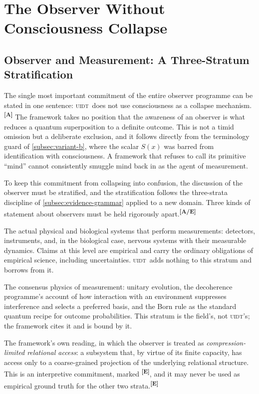 \documentclass[12pt,a4paper,twoside]{article}
\theoremstyle{plain}
\theoremstyle{definition}
\theoremstyle{remark}
\newcommand{\UIDT}{\textsc{uidt}}
\newcommand{\catmark}[1]{\textsuperscript{\textsf{\textbf{[#1]}}}}
\begin{document}
\section{The Observer Without Consciousness Collapse}
\label{sec:observer-no-collapse}

\subsection{Observer and Measurement: A Three-Stratum Stratification}
\label{subsec:observer-stratification}

The single most important commitment of the entire observer programme can be stated in one sentence: \UIDT\ does not use consciousness as a collapse mechanism.\catmark{A} The framework takes no position that the awareness of an observer is what reduces a quantum superposition to a definite outcome. This is not a timid omission but a deliberate exclusion, and it follows directly from the terminology guard of \cref{subsec:variant-b}, where the scalar $S(x)$ was barred from identification with consciousness. A framework that refuses to call its primitive ``mind'' cannot consistently smuggle mind back in as the agent of measurement.

To keep this commitment from collapsing into confusion, the discussion of the observer must be stratified, and the stratification follows the three-strata discipline of \cref{subsec:evidence-grammar} applied to a new domain. Three kinds of statement about observers must be held rigorously apart.\catmark{A/E}

\begin{description}[leftmargin=1.4em,style=nextline]
\item[Stratum~I: Empirical observer systems.] The actual physical and biological systems that perform measurements: detectors, instruments, and, in the biological case, nervous systems with their measurable dynamics. Claims at this level are empirical and carry the ordinary obligations of empirical science, including uncertainties. \UIDT\ adds nothing to this stratum and borrows from it. \item[Stratum~II: Standard quantum and decoherence formalism.] The consensus physics of measurement: unitary evolution, the decoherence programme's account of how interaction with an environment suppresses interference and selects a preferred basis, and the Born rule as the standard quantum recipe for outcome probabilities. This stratum is the field's, not \UIDT's; the framework cites it and is bound by it. \item[Stratum~III: The \UIDT\ interpretation.] The framework's own reading, in which the observer is treated as \emph{compression-limited relational access}: a subsystem that, by virtue of its finite capacity, has access only to a coarse-grained projection of the underlying relational structure. This is an interpretive commitment, marked \catmark{E}, and it may never be used as empirical ground truth for the other two strata.\catmark{E}
\end{description}
\end{document}
